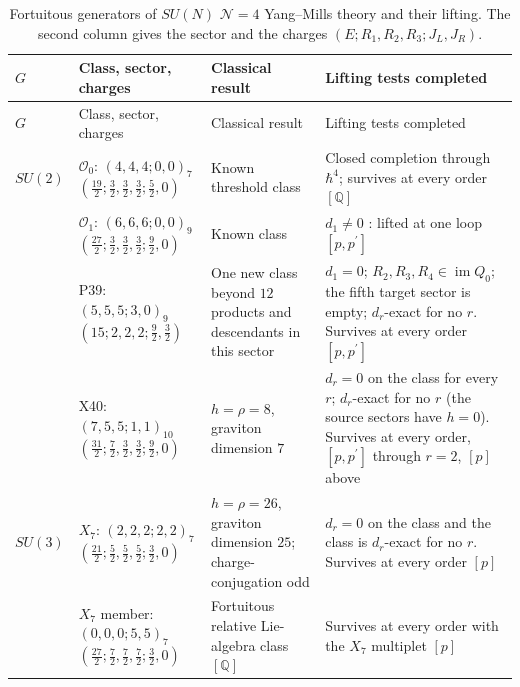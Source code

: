 \documentclass[11pt]{article}
\numberwithin{equation}{section}
\numberwithin{figure}{section}
\numberwithin{table}{section}
\begin{document}
{\footnotesize\renewcommand{\arraystretch}{1.3}\setlength{\tabcolsep}{3.5pt}
\begin{xltabular}{\linewidth}{|l|>{\raggedright\arraybackslash}p{3.55cm}|>{\raggedright\arraybackslash}X|>{\raggedright\arraybackslash}X|}
\caption{Fortuitous generators of $SU(N)$ $\mathcal N=4$ Yang--Mills theory and their lifting. The second column gives the sector and the charges $(E;R_1,R_2,R_3;J_L,J_R)$.}\label{local-ch9-su-classes}\\
\hline
$G$ & Class, sector, charges & Classical result & Lifting tests completed\\
\hline\endfirsthead
\hline
$G$ & Class, sector, charges & Classical result & Lifting tests completed\\
\hline\endhead
$SU(2)$ & $\mathcal O_0$: $(4,4,4;0,0)_7$\newline $(\tfrac{19}2;\tfrac32,\tfrac32,\tfrac32;\tfrac52,0)$ & Known threshold class \cite{KKLP,ChangLinWords} & Closed completion through $\hbar^4$; survives at every order $[\mathbb Q]$\\
 & $\mathcal O_1$: $(6,6,6;0,0)_9$\newline $(\tfrac{27}2;\tfrac32,\tfrac32,\tfrac32;\tfrac92,0)$ & Known class \cite{microstates} & $d_1\ne0$ \cite{KKLP}: lifted at one loop $[p,p^{\prime}]$\\
 & P39: $(5,5,5;3,0)_9$\newline $(15;2,2,2;\tfrac92,\tfrac32)$ & One new class beyond $12$ products and descendants in this sector & $d_1=0$; $R_2,R_3,R_4\in\operatorname{im}Q_0$; the fifth target sector is empty; $d_r$-exact for no $r$. Survives at every order $[p,p^{\prime}]$\\
 & X40: $(7,5,5;1,1)_{10}$\newline $(\tfrac{31}2;\tfrac72,\tfrac32,\tfrac32;\tfrac92,0)$ & $h=\rho=8$, graviton dimension $7$ & $d_r=0$ on the class for every $r$; $d_r$-exact for no $r$ (the source sectors have $h=0$). Survives at every order, $[p,p^{\prime}]$ through $r=2$, $[p]$ above\\
\hline
$SU(3)$ & $X_7$: $(2,2,2;2,2)_7$\newline $(\tfrac{21}2;\tfrac52,\tfrac52,\tfrac52;\tfrac32,0)$ & $h=\rho=26$, graviton dimension $25$; charge-conjugation odd & $d_r=0$ on the class and the class is $d_r$-exact for no $r$. Survives at every order $[p]$\\
 & $X_7$ member: $(0,0,0;5,5)_7$\newline $(\tfrac{27}2;\tfrac72,\tfrac72,\tfrac72;\tfrac32,0)$ & Fortuitous relative Lie-algebra class $[\mathbb Q]$ & Survives at every order with the $X_7$ multiplet $[p]$\\

\end{xltabular}}
\end{document}
